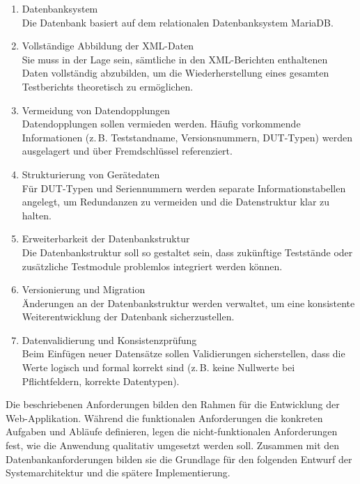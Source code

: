 \begin{enumerate}

  \item Datenbanksystem \\
  Die Datenbank basiert auf dem relationalen Datenbanksystem MariaDB.

  \item Vollständige Abbildung der XML-Daten \\
  Sie muss in der Lage sein, sämtliche in den XML-Berichten enthaltenen Daten vollständig abzubilden,
  um die Wiederherstellung eines gesamten Testberichts theoretisch zu ermöglichen.

  \item Vermeidung von Datendopplungen \\
  Datendopplungen sollen vermieden werden.
  Häufig vorkommende Informationen (z.\,B. Teststandname, Versionsnummern, DUT-Typen) werden ausgelagert und über Fremdschlüssel referenziert.

  \item Strukturierung von Gerätedaten \\
  Für DUT-Typen und Seriennummern werden separate Informationstabellen angelegt,
  um Redundanzen zu vermeiden und die Datenstruktur klar zu halten.

  \item Erweiterbarkeit der Datenbankstruktur \\
  Die Datenbankstruktur soll so gestaltet sein, dass zukünftige Teststände oder zusätzliche Testmodule problemlos integriert werden können.

  \item Versionierung und Migration \\
  Änderungen an der Datenbankstruktur werden verwaltet,
  um eine konsistente Weiterentwicklung der Datenbank sicherzustellen.

  \item Datenvalidierung und Konsistenzprüfung \\
  Beim Einfügen neuer Datensätze sollen Validierungen sicherstellen,
  dass die Werte logisch und formal korrekt sind (z.\,B. keine Nullwerte bei Pflichtfeldern, korrekte Datentypen).
\end{enumerate}

Die beschriebenen Anforderungen bilden den Rahmen für die Entwicklung der Web-Applikation.
Während die funktionalen Anforderungen die konkreten Aufgaben und Abläufe definieren,
legen die nicht-funktionalen Anforderungen fest, wie die Anwendung qualitativ umgesetzt werden soll.
Zusammen mit den Datenbankanforderungen bilden sie die Grundlage für den folgenden Entwurf der Systemarchitektur und die spätere Implementierung.
